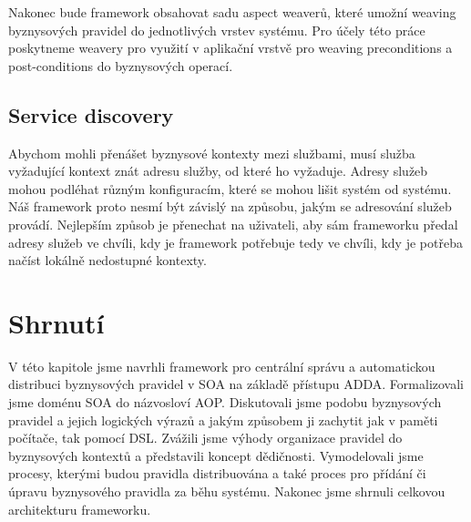 Nakonec bude framework obsahovat sadu aspect weaverů, které umožní weaving byznysových pravidel do
jednotlivých vrstev systému. Pro účely této práce poskytneme weavery pro využití v aplikační vrstvě
pro weaving preconditions a post-conditions do byznysových operací.

\subsection{Service discovery}

Abychom mohli přenášet byznysové kontexty mezi službami, musí služba vyžadující kontext
znát adresu služby, od které ho vyžaduje. Adresy služeb mohou podléhat různým konfiguracím,
které se mohou lišit systém od systému. Náš framework proto nesmí být závislý na způsobu,
jakým se adresování služeb provádí. Nejlepším způsob je přenechat na uživateli, aby sám
frameworku předal adresy služeb ve chvíli, kdy je framework potřebuje \textendash\xspace tedy
ve chvíli, kdy je potřeba načíst lokálně nedostupné kontexty.

\section{Shrnutí}

V této kapitole jsme navrhli framework pro centrální správu a automatickou distribuci
byznysových pravidel v \gls{SOA} na základě přístupu \gls{ADDA}. Formalizovali jsme
doménu \gls{SOA} do názvosloví \gls{AOP}. Diskutovali jsme podobu byznysových pravidel a jejich
logických výrazů a jakým způsobem ji zachytit jak v paměti počítače, tak pomocí \gls{DSL}.
Zvážili jsme výhody organizace pravidel do byznysových kontextů a představili koncept dědičnosti.
Vymodelovali jsme procesy, kterými budou pravidla distribuována a také proces pro přídání či úpravu
byznysového pravidla za běhu systému. Nakonec jsme shrnuli celkovou architekturu frameworku.
